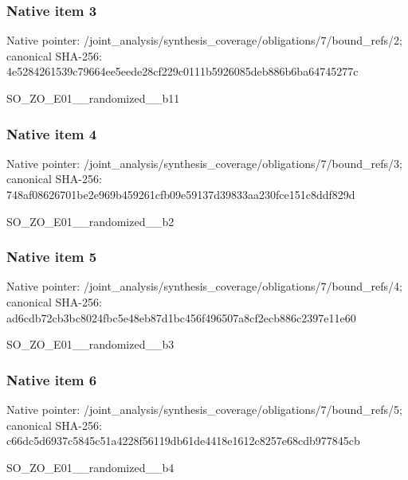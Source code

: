 \documentclass[10pt,a4paper]{article}
\begin{document}
\subsubsection{Native item 3}
Native pointer: /joint\_\allowbreak{}analysis/synthesis\_\allowbreak{}coverage/obligations/7/bound\_\allowbreak{}refs/2; canonical SHA-256: 4e5284261539c79664ee5eede28cf229c0111b5926085deb886b6ba64745277c

\begingroup\raggedright\sloppy SO\_\allowbreak{}ZO\_\allowbreak{}E01\_\allowbreak{}\_\allowbreak{}randomized\_\allowbreak{}\_\allowbreak{}b11\par\endgroup

\subsubsection{Native item 4}
Native pointer: /joint\_\allowbreak{}analysis/synthesis\_\allowbreak{}coverage/obligations/7/bound\_\allowbreak{}refs/3; canonical SHA-256: 748af08626701be2e969b459261cfb09e59137d39833aa230fce151c8ddf829d

\begingroup\raggedright\sloppy SO\_\allowbreak{}ZO\_\allowbreak{}E01\_\allowbreak{}\_\allowbreak{}randomized\_\allowbreak{}\_\allowbreak{}b2\par\endgroup

\subsubsection{Native item 5}
Native pointer: /joint\_\allowbreak{}analysis/synthesis\_\allowbreak{}coverage/obligations/7/bound\_\allowbreak{}refs/4; canonical SHA-256: ad6cdb72cb3bc8024fbc5e48eb87d1bc456f496507a8cf2ecb886c2397e11e60

\begingroup\raggedright\sloppy SO\_\allowbreak{}ZO\_\allowbreak{}E01\_\allowbreak{}\_\allowbreak{}randomized\_\allowbreak{}\_\allowbreak{}b3\par\endgroup

\subsubsection{Native item 6}
Native pointer: /joint\_\allowbreak{}analysis/synthesis\_\allowbreak{}coverage/obligations/7/bound\_\allowbreak{}refs/5; canonical SHA-256: c66dc5d6937c5845c51a4228f56119db61de4418e1612c8257e68cdb977845cb

\begingroup\raggedright\sloppy SO\_\allowbreak{}ZO\_\allowbreak{}E01\_\allowbreak{}\_\allowbreak{}randomized\_\allowbreak{}\_\allowbreak{}b4\par\endgroup
\end{document}
